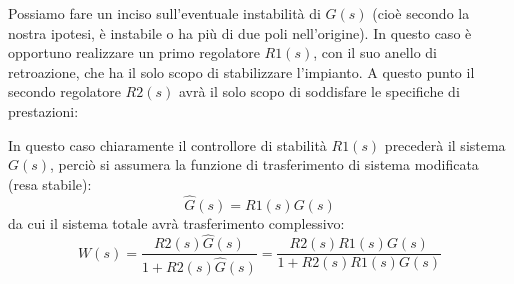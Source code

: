 \documentclass[a4paper,11pt]{article}
\begin{document}
Possiamo fare un inciso sull'eventuale instabilità di $G(s)$ (cioè secondo la nostra ipotesi, è instabile o ha più di due poli nell'origine).
In questo caso è opportuno realizzare un primo regolatore $R1(s)$, con il suo anello di retroazione, che ha il solo scopo di stabilizzare l'impianto.
A questo punto il secondo regolatore $R2(s)$ avrà il solo scopo di soddisfare le specifiche di prestazioni:
\begin{center}
\end{center}

In questo caso chiaramente il controllore di stabilità $R1(s)$ precederà il sistema $G(s)$, perciò si assumera la funzione di trasferimento di sistema modificata (resa stabile):
$$
\hat{G}(s) = R1(s) G(s)
$$
da cui il sistema totale avrà trasferimento complessivo:
$$
W(s) = \frac{R2(s) \hat{G}(s)}{1 + R2(s) \hat{G}(s)} = \frac{R2(s) R1(s) G(s)}{1 + R2(s) R1(s) G(s)}
$$
\end{document}
